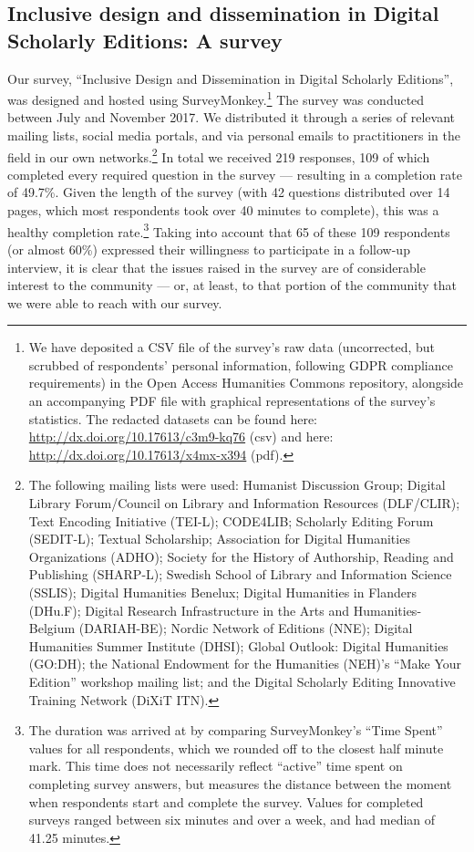 \begin{paper}
\section*{Inclusive design and dissemination in Digital Scholarly
Editions: A survey}

Our survey, ``Inclusive Design and Dissemination in Digital Scholarly
Editions'', was designed and hosted using SurveyMonkey.\footnote{We have
  deposited a CSV file of the survey's raw data (uncorrected, but
  scrubbed of respondents' personal information, following GDPR
  compliance requirements) in the Open Access Humanities Commons
  repository, alongside an accompanying PDF file with graphical
  representations of the survey's statistics. The redacted datasets can
  be found here: \href{http://dx.doi.org/10.17613/c3m9-kq76}{http://dx.doi.org/10.17613/c3m9-kq76} (csv) and here: \href{http://dx.doi.org/10.17613/x4mx-x394}{http://dx.doi.org/10.17613/x4mx-x394} (pdf).}
The survey was conducted between July and November 2017. We distributed
it through a series of relevant mailing lists, social media portals, and
via personal emails to practitioners in the field in our own
networks.\footnote{The following mailing lists were used: Humanist
  Discussion Group; Digital \mbox{Library} Forum/Council on Library and
  Information Resources (DLF/CLIR); Text Encoding Initiative (TEI-L);
  CODE4LIB; Scholarly Editing Forum (SEDIT-L); Textual Scholarship;
  Association for Digital Humanities Organizations (ADHO); Society for
  the History of \mbox{Authorship}, Reading and Publishing (SHARP-L); Swedish
  School of Library and Information Science (SSLIS); Digital Humanities
  Benelux; Digital Humanities in Flanders (DHu.F); Digital Research
  Infrastructure in the Arts and Humanities-Belgium (DARIAH-BE); Nordic
  Network of Editions (NNE); Digital Humanities Summer Institute (DHSI);
  Global Outlook: Digital Humanities (GO:DH); the National Endowment for
  the Humanities (NEH)'s ``Make Your Edition'' workshop mailing list;
  and the Digital Scholarly Editing Innovative Training Network (DiXiT
  ITN).} In total we received 219 responses, 109 of which completed
every required question in the survey --- resulting in a completion rate
of 49.7\%. Given the length of the survey (with 42 questions distributed
over 14 pages, which most respondents took over 40 minutes to complete),
this was a healthy completion rate.\footnote{The duration was arrived at
  by comparing SurveyMonkey's ``Time Spent'' values for all respondents,
  which we rounded off to the closest half minute mark. This time does
  not necessarily reflect ``active'' time spent on completing survey
  answers, but measures the distance between the moment when respondents
  start and complete the survey. Values for completed surveys ranged
  between six minutes and over a week, and had median of 41.25 minutes.}
Taking into account that 65 of these 109 respondents (or almost 60\%)
expressed their willingness to participate in a follow-up interview, it
is clear that the issues raised in the survey are of considerable
interest to the community --- or, at least, to that portion of the
community that we were able to reach with our survey.


\end{paper}

